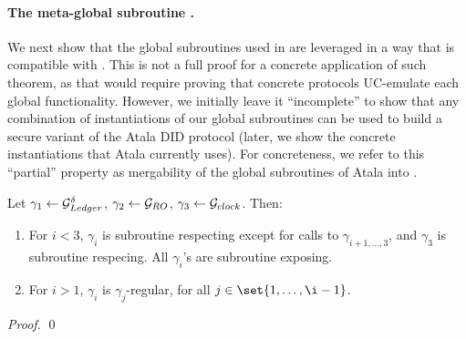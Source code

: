 \paragraph{The meta-global subroutine \gAtala.} %
We next show that the global subroutines used in \RealPKIDIDAtala are leveraged
in a way that is compatible with \cite[Theorem 4.3]{bhz21}. This is not a full
proof for a concrete application of such theorem, as that would require proving
that concrete protocols UC-emulate each global functionality. However, we
initially leave it ``incomplete'' to show that any combination of instantiations
of our global subroutines can be used to build a secure variant of the Atala
DID protocol (later, we show the concrete instantiations that Atala currently
uses). For concreteness, we refer to this ``partial'' property as mergability
of the global subroutines of Atala into \gAtala.

\begin{lemma}
  \label{lma:gAtala}
  Let $\gamma_1 \gets \mathcal{G}_{Ledger}^\delta$, $\gamma_2 \gets \mathcal{G}_{RO}$, $\gamma_3
  \gets \mathcal{G}_{clock}$. Then:
  \begin{enumerate}
  \item For $i < 3$, $\gamma_i$ is subroutine respecting except for calls to
    $\gamma_{i+1,\dots,3}$, and $\gamma_3$ is subroutine respecing. All
  $\gamma_i$'s are subroutine exposing.
\item For $i>1$, $\gamma_i$ is $\gamma_j$-regular, for all $j \in \set{1,
    \dots,\i-1}$.
  \end{enumerate}
\end{lemma}

\begin{proof}
  \qed
\end{proof}




